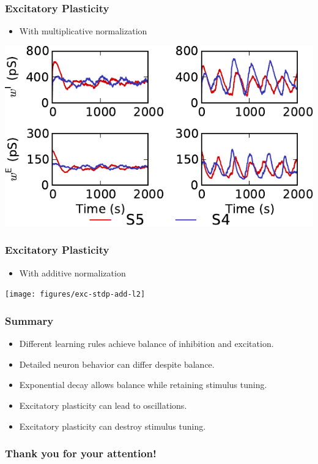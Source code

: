 \documentclass{beamer}
\begin{document}
\begin{frame} \frametitle{Excitatory Plasticity}
    \begin{itemize}
        \item With multiplicative normalization
    \end{itemize}
    \begin{center}
        \includegraphics[width=\textwidth]{figures/exc-stdp-mult-l2}
    \end{center}
\end{frame}

\begin{frame} \frametitle{Excitatory Plasticity}
    \begin{itemize}
        \item With additive normalization
    \end{itemize}
    \begin{center}
        \texttt{[image: figures/exc-stdp-add-l2]}
    \end{center}
\end{frame}

\begin{frame} \frametitle{Summary}
    \begin{itemize}
        \item Different learning rules achieve balance of inhibition and 
            excitation.
        \item Detailed neuron behavior can differ despite balance.
        \item Exponential decay allows balance while retaining stimulus tuning.
        \item Excitatory plasticity can lead to oscillations.
        \item Excitatory plasticity can destroy stimulus tuning.
    \end{itemize}
\end{frame}

\begin{frame} \frametitle{Thank you for your attention!}
    \printbibliography
\end{frame}
\end{document}
